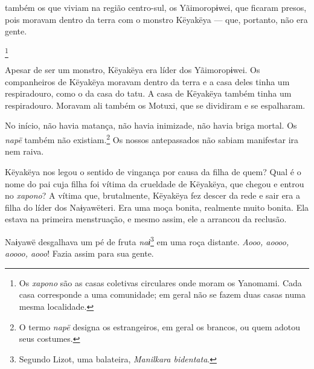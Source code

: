  também os que viviam na região centro-sul, os
Yãimoropɨwei, que ficaram presos, pois moravam dentro da terra com o
monstro Këyakëya --- que, portanto, não era gente. 

\footnote{Os \textit{xapono} são as casas coletivas circulares onde moram os Yanomami. Cada casa corresponde a uma comunidade; em geral não se fazem duas casas numa mesma localidade.} 

Apesar de ser um monstro, Këyakëya era líder dos Yãimoropɨwei. Os
companheiros de Këyakëya moravam dentro da terra e a casa deles tinha um
respiradouro, como o da casa do tatu. A casa de Këyakëya também tinha um
respiradouro. Moravam ali também os Motuxi, que se dividiram e se
espalharam. 


No início, não havia matança, não havia inimizade, não havia briga
mortal. Os \textit{napë} também não existiam.\footnote{O termo \textit{napë} designa os estrangeiros, em geral os brancos, ou quem adotou seus costumes.} Os nossos antepassados não sabiam manifestar ira nem raiva. 


Këyakëya nos legou o sentido de vingança por causa da filha de quem?
Qual é o nome do pai cuja filha foi vítima da crueldade de Këyakëya, que
chegou e entrou no \textit{xapono}? A vítima que, brutalmente, Këyakëya fez
descer da rede e sair era a filha do líder dos Naɨyawëteri. Era uma moça
bonita, realmente muito bonita. Ela estava na primeira menstruação, e
mesmo assim, ele a arrancou da reclusão.


Naɨyawë desgalhava um pé de fruta \textit{naɨ}\footnote{ Segundo Lizot, uma balateira, \textit{Manilkara bidentata}.} em uma roça
distante. \textit{Aooo, aoooo, aoooo, aooo}! Fazia assim para sua gente. 

